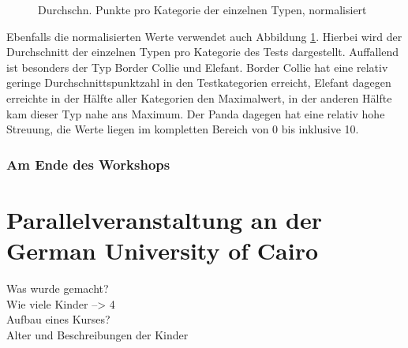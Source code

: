 	\begin{figure}[H]
		\centering
		\caption[Auswertung Durchschnitt]{Durchschn. Punkte pro Kategorie der einzelnen Typen, normalisiert}
		\label{img:auswertung_typus}
	\end{figure}

	Ebenfalls die normalisierten Werte verwendet auch Abbildung \ref{img:auswertung_typus}. Hierbei wird der Durchschnitt der einzelnen Typen pro Kategorie des Tests dargestellt. Auffallend ist besonders der Typ Border Collie und Elefant. Border Collie hat eine relativ geringe Durchschnittspunktzahl in den Testkategorien erreicht, Elefant dagegen erreichte in der Hälfte aller Kategorien den Maximalwert, in der anderen Hälfte kam dieser Typ nahe ans Maximum. Der Panda dagegen hat eine relativ hohe Streuung, die Werte liegen im kompletten Bereich von 0 bis inklusive 10.\\
	\subsubsection{Am Ende des Workshops}
	
\section{Parallelveranstaltung an der German University of Cairo}
Was wurde gemacht? \\
Wie viele Kinder --> 4 \\
Aufbau eines Kurses?\\
Alter und Beschreibungen der Kinder\\